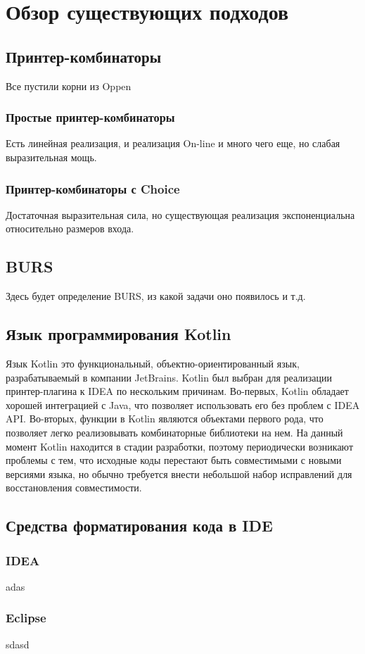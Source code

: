 \section{Обзор существующих подходов}

\subsection{Принтер-комбинаторы}
Все пустили корни из Oppen

\subsubsection{Простые принтер-комбинаторы}
Есть линейная реализация, и реализация On-line и много чего еще, но слабая выразительная мощь.

\subsubsection{Принтер-комбинаторы с Choice}
Достаточная выразительная сила, но существующая реализация экспоненциальна
относительно размеров входа.

\subsection{BURS}
Здесь будет определение BURS, из какой задачи оно появилось и т.д.

\subsection{Язык программирования Kotlin}

Язык Kotlin это функциональный, объектно-ориентированный язык, разрабатываемый в компании JetBrains.
Kotlin был выбран для реализации принтер-плагина к IDEA по нескольким причинам.  
Во-первых, Kotlin обладает хорошей интеграцией с Java, что позволяет использовать
его без проблем с IDEA API. 
Во-вторых, функции в Kotlin являются объектами первого рода, что позволяет
легко реализовывать комбинаторные библиотеки на нем.
На данный момент Kotlin находится в стадии разработки, поэтому периодически возникают
проблемы с тем, что исходные коды перестают быть совместимыми с новыми версиями языка,
но обычно требуется внести небольшой набор исправлений для восстановления совместимости.

\subsection{Средства форматирования кода в IDE}

\subsubsection{IDEA}
adas
\subsubsection{Eclipse}
sdasd
